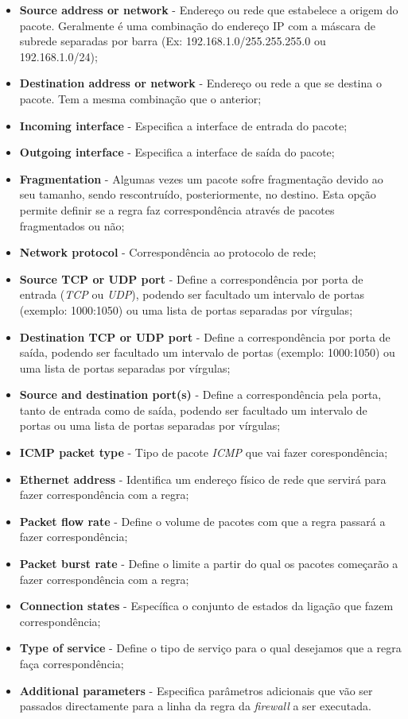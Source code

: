 \begin{itemize}
    \item \textbf{Source address or network} - Endereço ou rede que estabelece a origem do pacote. Geralmente é uma combinação do endereço IP com a máscara de subrede separadas por barra (Ex: 192.168.1.0/255.255.255.0 ou 192.168.1.0/24);
    \item \textbf{Destination address or network} - Endereço ou rede a que se destina o pacote. Tem a mesma combinação que o anterior;
    \item \textbf{Incoming interface} - Especifica a interface de entrada do pacote;
    \item \textbf{Outgoing interface} - Especifica a interface de saída do pacote;
    \item \textbf{Fragmentation} - Algumas vezes um pacote sofre fragmentação devido ao seu tamanho, sendo rescontruído, posteriormente, no destino. Esta opção permite definir se a regra faz correspondência através de pacotes fragmentados ou não;
    \item \textbf{Network protocol} - Correspondência ao protocolo de rede;
    \item \textbf{Source TCP or UDP port} - Define a correspondência por porta de entrada (\textit{TCP} ou \textit{UDP}), podendo ser facultado um intervalo de portas (exemplo: 1000:1050) ou uma lista de portas separadas por vírgulas;
    \item \textbf{Destination TCP or UDP port} - Define a correspondência por porta de saída, podendo ser facultado um intervalo de portas (exemplo: 1000:1050) ou uma lista de portas separadas por vírgulas;
    \item \textbf{Source and destination port(s)} - Define a correspondência pela porta, tanto de entrada como de saída, podendo ser facultado um intervalo de portas ou uma lista de portas separadas por vírgulas;
    \item \textbf{ICMP packet type} - Tipo de pacote \textit{ICMP} que vai fazer corespondência;
    \item \textbf{Ethernet address} - Identifica um endereço físico de rede que servirá para fazer correspondência com a regra;
    \item \textbf{Packet flow rate} - Define o volume de pacotes com que a regra passará a fazer correspondência;
    \item \textbf{Packet burst rate} - Define o limite a partir do qual os pacotes começarão a fazer correspondência com a regra;
    \item \textbf{Connection states} - Específica o conjunto de estados da ligação que fazem correspondência;
    \item \textbf{Type of service} - Define o tipo de serviço para o qual desejamos que a regra faça correspondência;
    \item \textbf{Additional parameters} - Especifica parâmetros adicionais que vão ser passados directamente para a linha da regra da \textit{firewall} a ser executada.
\end{itemize}

